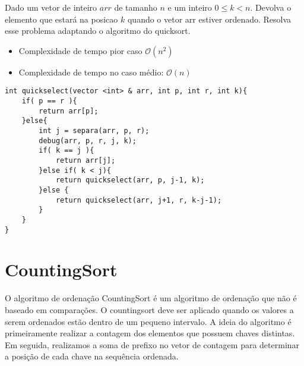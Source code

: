 \begin{exemplo}

Dado um vetor de inteiro $arr$ de tamanho $n$ e um inteiro  $0 \leq k < n$. Devolva o elemento que estará na posicao $k$ quando o vetor arr estiver ordenado. Resolva esse problema adaptando o algoritmo do quicksort.

\begin{itemize}
\item Complexidade de tempo pior caso $\mathcal{O}(n^2)$
\item Complexidade de tempo no caso médio: $\mathcal{O}(n)$    
\end{itemize}

\end{exemplo}

\begin{verbatim}
int quickselect(vector <int> & arr, int p, int r, int k){
    if( p == r ){
        return arr[p];
    }else{
        int j = separa(arr, p, r);
        debug(arr, p, r, j, k);
        if( k == j ){
            return arr[j];
        }else if( k < j){
            return quickselect(arr, p, j-1, k);
        }else {
            return quickselect(arr, j+1, r, k-j-1);
        }
    }
}

\end{verbatim}



\section{CountingSort}

O algoritmo de ordenação CountingSort é um algoritmo de ordenação que não é baseado em comparações. O countingsort deve ser aplicado quando os valores a serem ordenados estão dentro de um pequeno intervalo. A ideia do algoritmo é primeiramente realizar a contagem dos elementos que possuem chaves distintas. Em seguida, realizamos a soma de prefixo no vetor de contagem para determinar a posição de cada chave na sequência ordenada.

